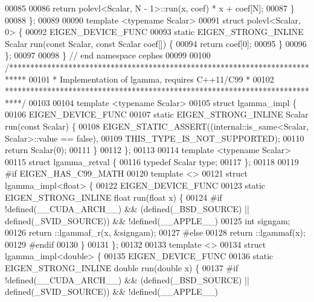 \begin{DoxyCode}
00085 
00086     \textcolor{keywordflow}{return} polevl<Scalar, N - 1>::run(x, coef) * x + coef[N];
00087   \}
00088 \};
00089 
00090 \textcolor{keyword}{template} <\textcolor{keyword}{typename} Scalar>
00091 \textcolor{keyword}{struct }polevl<Scalar, 0> \{
00092   EIGEN\_DEVICE\_FUNC
00093   \textcolor{keyword}{static} EIGEN\_STRONG\_INLINE Scalar run(\textcolor{keyword}{const} Scalar, \textcolor{keyword}{const} Scalar coef[]) \{
00094     \textcolor{keywordflow}{return} coef[0];
00095   \}
00096 \};
00097 
00098 \}  \textcolor{comment}{// end namespace cephes}
00099 
00100 \textcolor{comment}{/****************************************************************************}
00101 \textcolor{comment}{ * Implementation of lgamma, requires C++11/C99                             *}
00102 \textcolor{comment}{ ****************************************************************************/}
00103 
00104 \textcolor{keyword}{template} <\textcolor{keyword}{typename} Scalar>
00105 \textcolor{keyword}{struct }lgamma\_impl \{
00106   EIGEN\_DEVICE\_FUNC
00107   \textcolor{keyword}{static} EIGEN\_STRONG\_INLINE Scalar run(\textcolor{keyword}{const} Scalar) \{
00108     EIGEN\_STATIC\_ASSERT((internal::is\_same<Scalar, Scalar>::value == \textcolor{keyword}{false}),
00109                         THIS\_TYPE\_IS\_NOT\_SUPPORTED);
00110     \textcolor{keywordflow}{return} Scalar(0);
00111   \}
00112 \};
00113 
00114 \textcolor{keyword}{template} <\textcolor{keyword}{typename} Scalar>
00115 \textcolor{keyword}{struct }lgamma\_retval \{
00116   \textcolor{keyword}{typedef} Scalar type;
00117 \};
00118 
00119 \textcolor{preprocessor}{#if EIGEN\_HAS\_C99\_MATH}
00120 \textcolor{keyword}{template} <>
00121 \textcolor{keyword}{struct }lgamma\_impl<float> \{
00122   EIGEN\_DEVICE\_FUNC
00123   \textcolor{keyword}{static} EIGEN\_STRONG\_INLINE \textcolor{keywordtype}{float} run(\textcolor{keywordtype}{float} x) \{
00124 \textcolor{preprocessor}{#if !defined(\_\_CUDA\_ARCH\_\_) && (defined(\_BSD\_SOURCE) || defined(\_SVID\_SOURCE)) && !defined(\_\_APPLE\_\_)}
00125     \textcolor{keywordtype}{int} signgam;
00126     return ::lgammaf\_r(x, &signgam);
00127 \textcolor{preprocessor}{#else}
00128     return ::lgammaf(x);
00129 \textcolor{preprocessor}{#endif}
00130   \}
00131 \};
00132 
00133 \textcolor{keyword}{template} <>
00134 \textcolor{keyword}{struct }lgamma\_impl<double> \{
00135   EIGEN\_DEVICE\_FUNC
00136   \textcolor{keyword}{static} EIGEN\_STRONG\_INLINE \textcolor{keywordtype}{double} run(\textcolor{keywordtype}{double} x) \{
00137 \textcolor{preprocessor}{#if !defined(\_\_CUDA\_ARCH\_\_) && (defined(\_BSD\_SOURCE) || defined(\_SVID\_SOURCE)) && !defined(\_\_APPLE\_\_)}

\end{DoxyCode}
